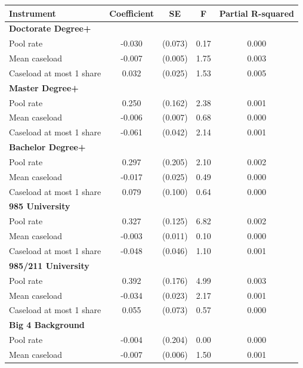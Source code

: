\documentclass[10pt]{article}
\newcommand{\sym}[1]{\textsuperscript{#1}}
\begin{document}
\begin{minipage}{19cm}\fontsize{10}{12}\selectfont\setlength{\tabcolsep}{4pt}\renewcommand{\arraystretch}{1.12}


\def\sym#1{\ifmmode^{#1}\else\(^{#1}\)\fi}
\centering
{}
\begin{threeparttable}
\begin{tabular}{p{}cccc}
\toprule
Instrument & Coefficient & SE & F & Partial R-squared \\
\midrule
\multicolumn{5}{l}{\textbf{Doctorate Degree+}} \\
Pool rate & -0.030 & (0.073) & 0.17 & 0.000 \\
Mean caseload & -0.007 & (0.005) & 1.75 & 0.003 \\
Caseload at most 1 share & 0.032 & (0.025) & 1.53 & 0.005 \\
\multicolumn{5}{l}{\textbf{Master Degree+}} \\
Pool rate & 0.250 & (0.162) & 2.38 & 0.001 \\
Mean caseload & -0.006 & (0.007) & 0.68 & 0.000 \\
Caseload at most 1 share & -0.061 & (0.042) & 2.14 & 0.001 \\
\multicolumn{5}{l}{\textbf{Bachelor Degree+}} \\
Pool rate & 0.297 & (0.205) & 2.10 & 0.002 \\
Mean caseload & -0.017 & (0.025) & 0.49 & 0.000 \\
Caseload at most 1 share & 0.079 & (0.100) & 0.64 & 0.000 \\
\multicolumn{5}{l}{\textbf{985 University}} \\
Pool rate & 0.327 & (0.125) & 6.82 & 0.002 \\
Mean caseload & -0.003 & (0.011) & 0.10 & 0.000 \\
Caseload at most 1 share & -0.048 & (0.046) & 1.10 & 0.001 \\
\multicolumn{5}{l}{\textbf{985/211 University}} \\
Pool rate & 0.392 & (0.176) & 4.99 & 0.003 \\
Mean caseload & -0.034 & (0.023) & 2.17 & 0.001 \\
Caseload at most 1 share & 0.055 & (0.073) & 0.57 & 0.000 \\
\multicolumn{5}{l}{\textbf{Big 4 Background}} \\
Pool rate & -0.004 & (0.204) & 0.00 & 0.000 \\
Mean caseload & -0.007 & (0.006) & 1.50 & 0.001 \\

\end{tabular}
\end{threeparttable}
\end{minipage}
\end{document}
